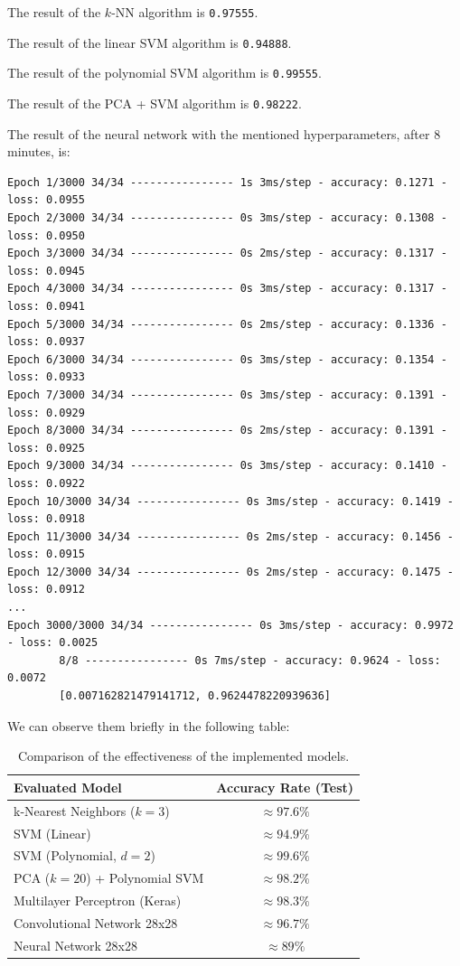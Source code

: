 \documentclass[11pt,a4paper]{article}
\begin{document}
The result of the $k$-NN algorithm is \texttt{0.97555}.

The result of the linear SVM algorithm is \texttt{0.94888}.

The result of the polynomial SVM algorithm is \texttt{0.99555}.

The result of the PCA + SVM algorithm is \texttt{0.98222}.

The result of the neural network with the mentioned hyperparameters, after 8 minutes, is:

{\footnotesize \begin{verbatim}
Epoch 1/3000 34/34 ---------------- 1s 3ms/step - accuracy: 0.1271 - loss: 0.0955
Epoch 2/3000 34/34 ---------------- 0s 3ms/step - accuracy: 0.1308 - loss: 0.0950
Epoch 3/3000 34/34 ---------------- 0s 2ms/step - accuracy: 0.1317 - loss: 0.0945
Epoch 4/3000 34/34 ---------------- 0s 3ms/step - accuracy: 0.1317 - loss: 0.0941
Epoch 5/3000 34/34 ---------------- 0s 2ms/step - accuracy: 0.1336 - loss: 0.0937
Epoch 6/3000 34/34 ---------------- 0s 3ms/step - accuracy: 0.1354 - loss: 0.0933
Epoch 7/3000 34/34 ---------------- 0s 3ms/step - accuracy: 0.1391 - loss: 0.0929
Epoch 8/3000 34/34 ---------------- 0s 2ms/step - accuracy: 0.1391 - loss: 0.0925
Epoch 9/3000 34/34 ---------------- 0s 3ms/step - accuracy: 0.1410 - loss: 0.0922
Epoch 10/3000 34/34 ---------------- 0s 3ms/step - accuracy: 0.1419 - loss: 0.0918
Epoch 11/3000 34/34 ---------------- 0s 2ms/step - accuracy: 0.1456 - loss: 0.0915
Epoch 12/3000 34/34 ---------------- 0s 2ms/step - accuracy: 0.1475 - loss: 0.0912
...
Epoch 3000/3000 34/34 ---------------- 0s 3ms/step - accuracy: 0.9972 - loss: 0.0025
        8/8 ---------------- 0s 7ms/step - accuracy: 0.9624 - loss: 0.0072  
        [0.007162821479141712, 0.9624478220939636]
\end{verbatim}}

We can observe them briefly in the following table:
\begin{table}[h]
\centering
\begin{tabular}{@{}lc@{}}
\toprule
\textbf{Evaluated Model} & \textbf{Accuracy Rate (Test)} \\ \midrule
k-Nearest Neighbors ($k=3$) & $\approx 97.6 \%$ \\
SVM (Linear) & $\approx 94.9 \%$ \\
SVM (Polynomial, $d=2$) & $\approx 99.6 \%$ \\
PCA ($k=20$) + Polynomial SVM & $\approx 98.2 \%$ \\
Multilayer Perceptron (Keras) & $\approx 98.3 \%$ \\ \midrule
Convolutional Network 28x28 & $\approx 96.7 \%$ \\
Neural Network 28x28 & $\approx 89\%$ \\  \bottomrule
\end{tabular}
\caption{Comparison of the effectiveness of the implemented models.} \label{c1}
\end{table}
\end{document}
